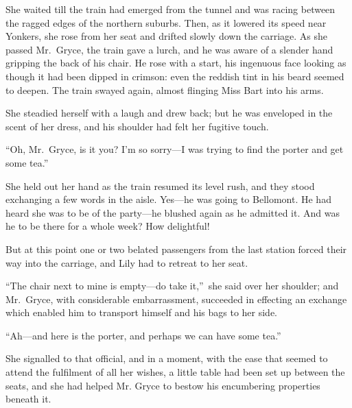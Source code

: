 \documentclass[12pt,a4paper]{book}
\begin{document}
She waited till the train had emerged from the tunnel and was
racing between the ragged edges of the northern suburbs. Then, as
it lowered its speed near Yonkers, she rose from her seat and
drifted slowly down the carriage. As she passed Mr.\ Gryce, the
train gave a lurch, and he was aware of a slender hand gripping
the back of his chair. He rose with a start, his ingenuous
face looking as though it had been dipped in crimson: even the
reddish tint in his beard seemed to deepen. The train swayed
again, almost flinging Miss Bart into his arms.





She steadied herself with a laugh and drew back; but he was
enveloped in the scent of her dress, and his shoulder had felt
her fugitive touch.





``Oh, Mr.\ Gryce, is it you? I'm so sorry---I was trying to find the
porter and get some tea.''





She held out her hand as the train resumed its level rush, and
they stood exchanging a few words in the aisle. Yes---he was going
to Bellomont. He had heard she was to be of the party---he blushed
again as he admitted it. And was he to be there for a whole week? 
How delightful!





But at this point one or two belated passengers from the last
station forced their way into the carriage, and Lily had to
retreat to her seat.





``The chair next to mine is empty---do take it,''\ she said over her
shoulder; and Mr.\ Gryce, with considerable embarrassment,
succeeded in effecting an exchange which enabled him to transport
himself and his bags to her side.





``Ah---and here is the porter, and perhaps we can have some tea.''





She signalled to that official, and in a moment, with the ease
that seemed to attend the fulfilment of all her wishes, a little
table had been set up between the seats, and she had helped Mr.
Gryce to bestow his encumbering properties beneath it.
\end{document}

